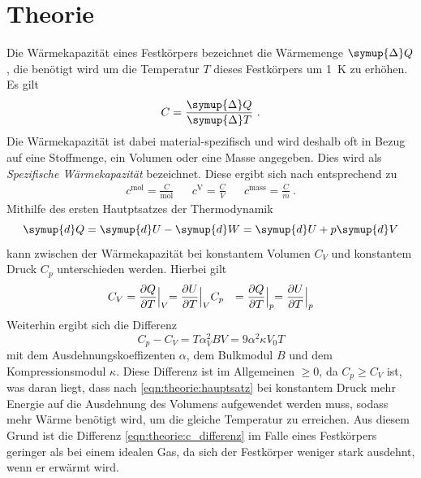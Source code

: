 \section{Theorie}
\label{sec:theorie}

    Die Wärmekapazität eines Festkörpers bezeichnet die Wärmemenge $\symup{\Delta} Q$,
    die benötigt wird um die Temperatur $T$ dieses Festkörpers um \SI{1}{\kelvin} zu erhöhen.
    Es gilt
    \begin{equation*}
        C = \frac{\symup{\Delta}Q}{\symup{\Delta}T} \ .
    \end{equation*}
    Die Wärmekapazität ist dabei material-spezifisch und wird deshalb oft in Bezug auf eine Stoffmenge,
    ein Volumen oder eine Masse angegeben.
    Dies wird als \textit{Spezifische Wärmekapazität} bezeichnet.
    Diese ergibt sich nach \cite{grossmarx} entsprechend zu
    \begin{align*}
        c^\text{mol} = \frac{C}{\si{\mol}} && c^\text{V} = \frac{C}{V} && c^\text{mass} = \frac{C}{m} \ .
    \end{align*}
    Mithilfe des ersten Hautptsatzes der Thermodynamik
    \begin{equation}
        \symup{d}Q = \symup{d}U - \symup{d}W = \symup{d}U + p\symup{d}V
        \label{eqn:theorie:hauptsatz}
    \end{equation}
    kann zwischen der Wärmekapazität bei konstantem Volumen $C_V$ und konstantem Druck $C_p$ unterschieden werden.
    Hierbei gilt
    \begin{align*}
        C_V &= \frac{\partial Q}{\partial T} \Bigl|_V = \frac{\partial U}{\partial T} \Bigl|_V
        C_p &= \frac{\partial Q}{\partial T} \Bigl|_p = \frac{\partial U}{\partial T} \Bigl|_p
    \end{align*}
    Weiterhin ergibt sich die Differenz
    \begin{equation}
        C_p - C_V = T \alpha^2_V B V = 9 \alpha^2 \kappa V_0 T
        \label{eqn:theorie:c_differenz}
    \end{equation}
    mit dem Ausdehnungskoeffizenten $\alpha$,
    dem Bulkmodul $B$ und dem Kompressionsmodul $\kappa$.
    Diese Differenz ist im Allgemeinen $\geq 0$,
    da $C_p \geq C_V$ ist,
    was daran liegt,
    dass nach \autoref{eqn:theorie:hauptsatz} bei konstantem Druck mehr Energie auf die Ausdehnung des Volumens aufgewendet werden muss,
    sodass mehr Wärme benötigt wird,
    um die gleiche Temperatur zu erreichen.
    Aus diesem Grund ist die Differenz \autoref{eqn:theorie:c_differenz} im Falle eines Festkörpers geringer als bei einem idealen Gas,
    da sich der Festkörper weniger stark ausdehnt,
    wenn er erwärmt wird.

